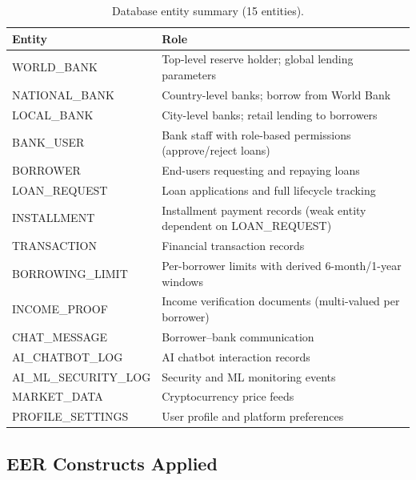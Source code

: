 \documentclass[12pt,a4paper]{report}
\newcommand{\tableheadfont}{\bfseries\small\color{PrimaryBlue}}
\newenvironment{moderntable}[1][H]{%
    \begin{table}[#1]\centering\small%
    \renewcommand{\arraystretch}{1.35}%
}{%
    \end{table}%
}
\begin{document}
\begin{moderntable}
\caption{Database entity summary (15 entities).}
\begin{tabular}{@{} >{\raggedright}p{3.5cm} >{\raggedright\arraybackslash}p{8.5cm} @{}}
\toprule
\tableheadfont Entity & \tableheadfont Role \\
\midrule
\rowcolor{RowShade}
WORLD\_BANK & Top-level reserve holder; global lending parameters \\
NATIONAL\_BANK & Country-level banks; borrow from World Bank \\
\rowcolor{RowShade}
LOCAL\_BANK & City-level banks; retail lending to borrowers \\
BANK\_USER & Bank staff with role-based permissions (approve/reject loans) \\
\rowcolor{RowShade}
BORROWER & End-users requesting and repaying loans \\
LOAN\_REQUEST & Loan applications and full lifecycle tracking \\
\rowcolor{RowShade}
INSTALLMENT & Installment payment records (weak entity dependent on LOAN\_REQUEST) \\
TRANSACTION & Financial transaction records \\
\rowcolor{RowShade}
BORROWING\_LIMIT & Per-borrower limits with derived 6-month/1-year windows \\
INCOME\_PROOF & Income verification documents (multi-valued per borrower) \\
\rowcolor{RowShade}
CHAT\_MESSAGE & Borrower--bank communication \\
AI\_CHATBOT\_LOG & AI chatbot interaction records \\
\rowcolor{RowShade}
AI\_ML\_SECURITY\_LOG & Security and ML monitoring events \\
MARKET\_DATA & Cryptocurrency price feeds \\
\rowcolor{RowShade}
PROFILE\_SETTINGS & User profile and platform preferences \\
\bottomrule
\end{tabular}
\end{moderntable}

\subsection{EER Constructs Applied}
\end{document}

